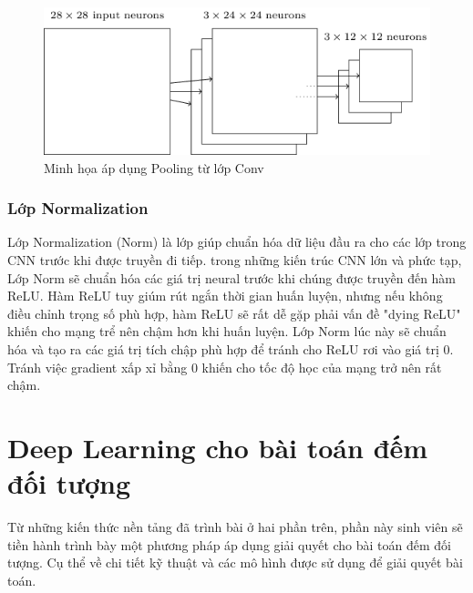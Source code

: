 \begin{figure}[ht]
  			\begin{center}
    				\includegraphics[scale=0.7]{pooling} 
    				\caption{Minh họa áp dụng Pooling từ lớp Conv}
    				\label{pooling}
  			\end{center}
\end{figure}	
	

\subsubsection{Lớp Normalization}
	Lớp Normalization (Norm) là lớp giúp chuẩn hóa dữ liệu đầu ra cho các lớp trong CNN trước khi được truyền đi tiếp. trong những kiến trúc CNN lớn và phức tạp, Lớp Norm sẽ chuẩn hóa các giá trị neural trước khi chúng được truyền đến hàm ReLU. Hàm ReLU tuy giúm rút ngắn thời gian huấn luyện, nhưng nếu không điều chỉnh trọng số phù hợp, hàm ReLU sẽ rất dễ gặp phải vấn đề "dying ReLU" khiến cho mạng trể nên chậm hơn khi huấn luyện. Lớp Norm lúc này sẽ chuẩn hóa và tạo ra các giá trị tích chập phù hợp để tránh cho ReLU rơi vào giá trị 0. Tránh việc gradient xấp xỉ bằng 0 khiến cho tốc độ học của mạng trở nên rất chậm.

\section{Deep Learning cho bài toán đếm đối tượng}
	Từ những kiến thức nền tảng đã trình bài ở hai phần trên, phần này sinh viên sẽ tiền hành trình bày một phương pháp áp dụng giải quyết cho bài toán đếm đối tượng. Cụ thể về chi tiết kỹ thuật và các mô hình được sử dụng để giải quyết bài toán. 

